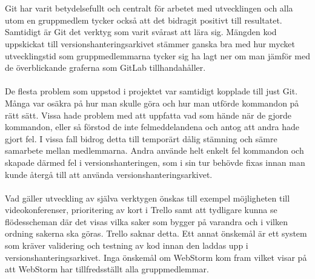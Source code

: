 \\\\
Git har varit betydelsefullt och centralt för arbetet med utvecklingen och alla utom en gruppmedlem tycker också att det bidragit positivt till resultatet. Samtidigt är Git det verktyg som varit svårast att lära sig. Mängden kod uppskickat till versionshanteringsarkivet stämmer ganska bra med hur mycket utvecklingstid som gruppmedlemmarna tycker sig ha lagt ner om man jämför  med de överblickande graferna som GitLab tillhandahåller.
\\\\
De flesta problem som uppstod i projektet var samtidigt kopplade till just Git. Många var osäkra på hur man skulle göra och hur man utförde kommandon på rätt sätt. Vissa hade problem med att uppfatta vad som hände när de gjorde kommandon, eller så förstod de inte felmeddelandena och antog att andra hade gjort fel. I vissa fall bidrog detta till temporärt dålig stämning och sämre samarbete mellan medlemmarna. Andra använde helt enkelt fel kommandon och skapade därmed fel i versionshanteringen, som i sin tur behövde fixas innan man kunde återgå till att använda versionshanteringsarkivet.
\\\\
Vad gäller utveckling av själva verktygen önskas till exempel möjligheten till videokonferenser, prioritering av kort i Trello samt att tydligare kunna se flödesscheman där det visas vilka saker som bygger på varandra och i vilken ordning sakerna ska göras. Trello saknar detta. Ett annat önskemål är ett system som kräver validering och testning av kod innan den laddas upp i versionshanteringsarkivet. Inga önskemål om WebStorm kom fram vilket visar på att WebStorm har tillfredsställt alla gruppmedlemmar.

